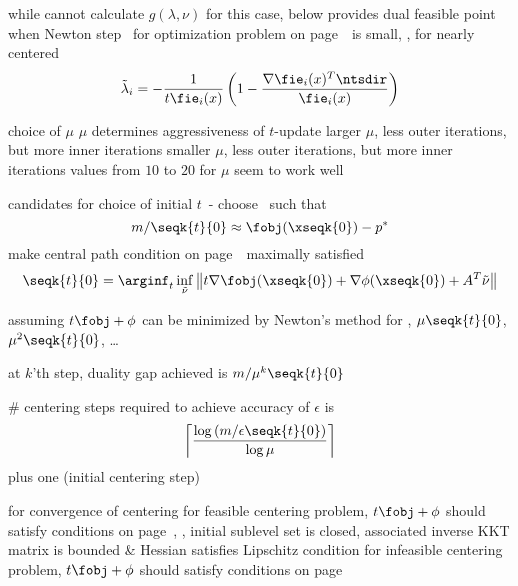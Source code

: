 \documentclass[17pt,landscape]{foils}
\begin{document}
{	\vitem
		while cannot calculate $g(\lambda,\nu)$ for this case,
		below provides dual feasible point
		when
		Newton step \ntsdir\ for optimization problem on page~\pageref{page:Central path}\ is small,
		\ie, for nearly centered
		$$
			\tilde{\lambda}_i
			= -\frac{1}{t\fie_i(x)}
				\left(
					1 - \frac{\nabla \fie_i(x)^T \ntsdir}{\fie_i(x)}
				\right)
		$$
	\eit
\eit



\bit
\vitem
	choice of $\mu$
	\bit
	\vitem
		$\mu$ determines aggressiveness of $t$-update
		\bit
		\viitem
			larger $\mu$, less outer iterations, but more inner iterations
		\viitem
			smaller $\mu$, less outer iterations, but more inner iterations
		\eit
	\vitem
		values from $10$ to $20$ for $\mu$
		seem to work well
	\eit

\vitem
	candidates for choice of initial $t$\
	- choose \ such that
	\bit
	\vitem []
		$$
			m / \seqk{t}{0} \approx \fobj(\xseqk{0}) - p^\ast
		$$
	\vitem [or]
		make central path condition on page~\pageref{page:Central path}\ maximally satisfied
		$$
			\seqk{t}{0}
			= \arginf_{t}
				\inf_{\tilde{\nu}}
				\left\|
					t \nabla \fobj(\xseqk{0}) + \nabla \phi(\xseqk{0}) + A^T \tilde{\nu}
				\right\|
		$$
	\eit
\eit
\vfill



\bit
\item
	assuming $t\fobj + \phi$
	can be minimized by Newton's method
	for
	,
	$\mu\seqk{t}{0}$,
	$\mu^2\seqk{t}{0}$,
	\ldots

\vvitem
	at $k$'th step, duality gap achieved is $m/\mu^k\seqk{t}{0}$

\vvitem
	\# centering steps required to achieve accuracy of $\epsilon$ is
	$$
		\left\lceil
		\frac{\log \left(m/\epsilon \seqk{t}{0}\right)}{\log \mu}
		\right\rceil
	$$
	plus one (initial centering step)

\vvitem
	for convergence of centering
	\bit
	\vitem
		for feasible centering problem,
		$t\fobj + \phi$ should satisfy conditions on page~\pageref{page:conv-analysis-assumptions-feasible-equality-Newton-method},
		\ie,
		initial sublevel set is closed,
		associated inverse KKT matrix is bounded
		\& Hessian satisfies Lipschitz condition
	\vitem
		for infeasible centering problem,
		$t\fobj + \phi$ should satisfy conditions on page~\pageref{page:conv-analysis-assumptions-infeasible-equality-Newton-method}\
	\eit
\eit


}
\end{document}
